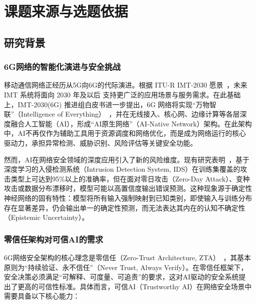 

\section{课题来源与选题依据}

\subsection{研究背景}

\subsubsection{6G网络的智能化演进与安全挑战}

移动通信网络正经历从5G向6G的代际演进。根据 ITU-R IMT-2030 愿景~\cite{ITU_IMT2030_2023}，未来 IMT 系统将面向 2030 年及以后
支持更广泛的应用场景与服务需求。在此基础上，IMT-2030(6G) 推进组白皮书进一步提出，6G 网络将实现“万物智联”（Intelligence of Everything）~\cite{IMT2030_6G_WhitePaper_2021}，并在无线接入、核心网、边缘计算等各层深度融合人工智能（AI），形成``AI原生网络''（AI-Native Network）架构。在此架构中，AI不再仅作为辅助工具用于资源调度和网络优化，而是成为网络运行的核心驱动力，承担异常检测、威胁识别、风险评估等关键安全功能。

然而，AI在网络安全领域的深度应用引入了新的风险维度。现有研究表明~\cite{BCNN-IDS,Tabarisaadi2024}，基于深度学习的入侵检测系统（Intrusion Detection System, IDS）在训练集覆盖的攻击类型上可达到95\%以上的准确率，但在面对零日攻击（Zero-Day Attack）、变种攻击或数据分布漂移时，模型可能以高置信度输出错误预测。这种现象源于确定性神经网络的固有特性：模型将所有输入强制映射到已知类别，即使输入与训练分布存在显著差异，仍会输出单一的确定性预测，而无法表达其内在的认知不确定性（Epistemic Uncertainty）。

\subsubsection{零信任架构对可信AI的需求}

6G网络安全架构的核心理念是零信任（Zero-Trust Architecture, ZTA）~\cite{NIST-ZTA}，其基本原则为``持续验证、永不信任''（Never Trust, Always Verify）。在零信任框架下，安全决策必须满足``可解释、可度量、可追责''的要求，这对AI驱动的安全系统提出了更高的可信性标准。具体而言，可信AI（Trustworthy AI）在网络安全场景中需要具备以下核心能力：

